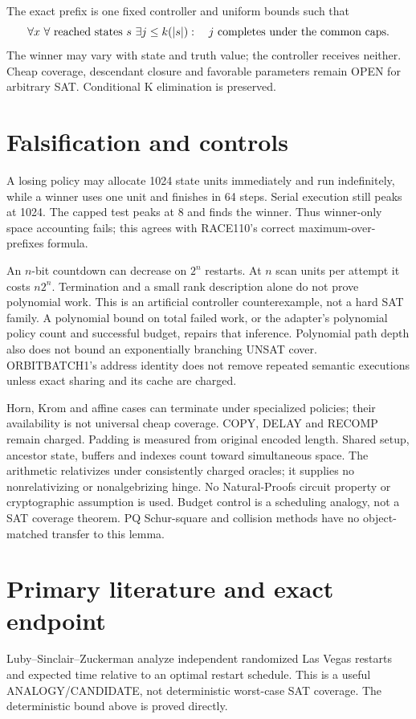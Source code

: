 \documentclass[11pt]{article}
\begin{document}
The exact prefix is one fixed controller and uniform bounds such that
\[
 \forall x\ \forall\hbox{ reached states }s\
 \exists j\le k(|s|):\quad
 j\hbox{ completes under the common caps}.
\]
The winner may vary with state and truth value; the controller receives neither.
Cheap coverage, descendant closure and favorable parameters remain OPEN for
arbitrary SAT. Conditional K elimination is preserved.

\section{Falsification and controls}
A losing policy may allocate 1024 state units immediately and run indefinitely,
while a winner uses one unit and finishes in 64 steps. Serial execution still
peaks at 1024. The capped test peaks at 8 and finds the winner. Thus
winner-only space accounting fails; this agrees with RACE110's correct
maximum-over-prefixes formula.

An $n$-bit countdown can decrease on $2^n$ restarts. At $n$ scan units per
attempt it costs $n2^n$. Termination and a small rank description alone do not
prove polynomial work. This is an artificial controller counterexample, not
a hard SAT family. A polynomial bound on total failed work, or the adapter's
polynomial policy count and successful budget, repairs that inference.
Polynomial path depth also does not bound an exponentially branching UNSAT
cover. ORBITBATCH1's address identity does not remove repeated semantic
executions unless exact sharing and its cache are charged.

Horn, Krom and affine cases can terminate under specialized policies; their
availability is not universal cheap coverage. COPY, DELAY and RECOMP remain
charged. Padding is measured from original encoded length. Shared setup,
ancestor state, buffers and indexes count toward simultaneous space.
The arithmetic relativizes under consistently charged oracles; it supplies
no nonrelativizing or nonalgebrizing hinge. No Natural-Proofs circuit property
or cryptographic assumption is used. Budget control is a scheduling analogy,
not a SAT coverage theorem. PQ Schur-square and collision methods have no
object-matched transfer to this lemma.

\section{Primary literature and exact endpoint}
Luby--Sinclair--Zuckerman analyze independent randomized Las Vegas restarts
and expected time relative to an optimal restart schedule. This is a useful
ANALOGY/CANDIDATE, not deterministic worst-case SAT coverage.
The deterministic bound above is proved directly.
\end{document}
